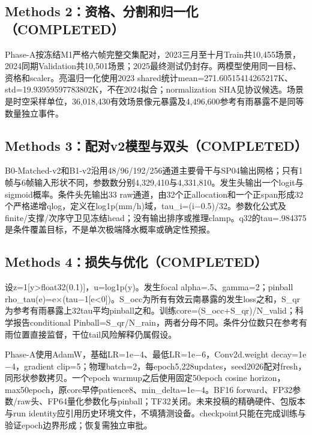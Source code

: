 \documentclass[UTF8,fontset=fandol,10pt]{ctexart}
\begin{document}
\subsection{Methods 2：资格、分割和归一化（COMPLETED）}

Phase-A按冻结M1严格六帧完整交集配对，2023三月至十月Train共10,455场景，2024同期Validation共10,501场景；2025最终测试仍封存。两模型使用同一目标、资格和scaler。亮温归一化使用2023 shared统计mean=271.60515414265217K、std=19.93959597783802K，不在2024拟合；normalization SHA见协议候选。场景是时空采样单位，36,018,430有效场景像元暴露及4,496,600参考有雨暴露不是同等数量独立事件。

\subsection{Methods 3：配对v2模型与双头（COMPLETED）}

B0-Matched-v2和B1-v2沿用48/\allowbreak{}96/\allowbreak{}192/\allowbreak{}256通道主要骨干与SP04输出网格；只有1帧与6帧输入形状不同，参数数分别4,329,410与4,331,810。发生头输出一个logit与sigmoid概率。条件头先输出33 raw通道，由32个正allocation和一个正span形成32个严格递增qlog，定义在log1p(mm/\allowbreak{}h)域，tau\_\allowbreak{}i=(i\(-\)0.5)/\allowbreak{}32。参数化公式及finite/\allowbreak{}支撑/\allowbreak{}次序守卫见冻结head；没有输出排序或推理clamp。q32的tau=.984375是条件覆盖目标，不是单次极端降水概率或确定性预报。

\subsection{Methods 4：损失与优化（COMPLETED）}

设z=1[y>float32(0.1)]，u=log1p(y)。发生focal alpha=.5、gamma=2；pinball rho\_\allowbreak{}tau(e)=e\(\times\)(tau\(-\)1[e<0])。S\_\allowbreak{}occ为所有有效云南暴露的发生loss之和，S\_\allowbreak{}qr为参考有雨暴露上32tau平均pinball之和。训练core=(S\_\allowbreak{}occ+S\_\allowbreak{}qr)/\allowbreak{}N\_\allowbreak{}valid；科学报告conditional Pinball=S\_\allowbreak{}qr/\allowbreak{}N\_\allowbreak{}rain，两者分母不同。条件分位数只在参考有雨位置直接监督，干位tail风险解释仍属假设。

Phase-A使用AdamW，基础LR=1e\(-\)4、最低LR=1e\(-\)6，Conv2d.weight decay=1e\(-\)4，gradient clip=5；物理batch=2，每epoch5,228updates，seed2026配对fresh，同形状参数拷贝。一个epoch warmup之后使用固定50epoch cosine horizon，max50epoch，原core早停patience8、min\_\allowbreak{}delta=1e\(-\)4。BF16 forward、FP32参数/\allowbreak{}raw头、FP64量化参数化与pinball；TF32关闭。未来投稿的精确硬件、包版本与run identity应引用历史环境文件，不填猜测设备。checkpoint只能在完成训练与验证epoch边界形成；恢复需独立审批。
\end{document}
